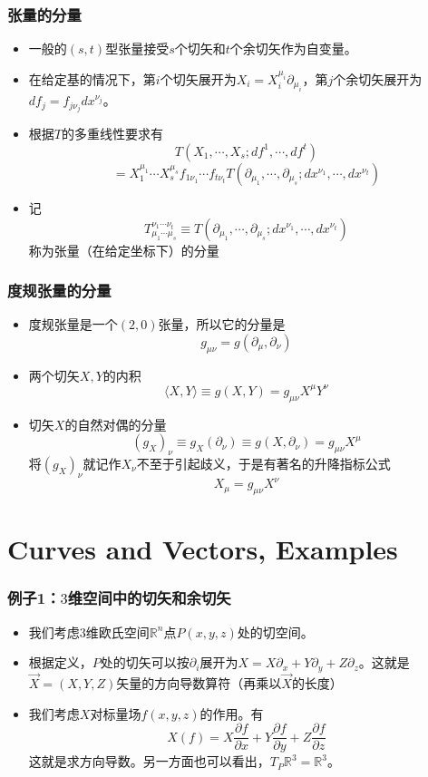 \documentclass[CJK]{beamer}
\newcommand{\reals}{\mathbb{R}}
\begin{document}
\begin{frame}
\frametitle{\bch 张量的分量 \ech}
\bch
\begin{itemize}
\item 一般的$(s,t)$型张量接受$s$个切矢和$t$个余切矢作为自变量。
\item 在给定基的情况下，第$i$个切矢展开为$X_i = X_i^{\mu_i} \partial_{\mu_i}$，第$j$个余切矢展开为$df_j = f_{j\nu_j} dx^{\nu_j}$。
\item 根据$T$的多重线性要求有$$
T(X_1,\cdots,X_s;df^1,\cdots,df^t) $$
$$
=X_1^{\mu_1} \cdots X_s^{\mu_s} f_{1\nu_1} \cdots f_{t\nu_t} T(\partial_{\mu_1} ,\cdots,\partial_{\mu_s};dx^{\nu_1},\cdots,dx^{\nu_t})
$$
\item 记{\color{blue}$$T^{\nu_1\cdots \nu_t}_{\mu_1\cdots \mu_s} \equiv  T(\partial_{\mu_1} ,\cdots,\partial_{\mu_s};dx^{\nu_1},\cdots,dx^{\nu_t})$$}
称为张量（在给定坐标下）的分量
\end{itemize}
\ech
\end{frame}

\begin{frame}
\frametitle{\bch 度规张量的分量 \ech}
\bch
\begin{itemize}
\item
度规张量是一个$(2,0)$张量，所以它的分量是
$$
g_{\mu \nu} = g(\partial_\mu,\partial_\nu)
$$
\item
两个切矢$X,Y$的内积
$$
\langle X,Y\rangle \equiv g(X,Y) = g_{\mu \nu} X^\mu Y^\nu
$$
\item 切矢$X$的自然对偶的分量
$$(g_X)_\nu \equiv g_X(\partial_\nu) \equiv g(X,\partial_\nu) = g_{\mu \nu} X^\mu 
$$
将$(g_X)_\nu$就记作$X_\nu$不至于引起歧义，于是有著名的升降指标公式
{\color{blue}
$$
X_\mu = g_{\mu \nu} X^\nu
$$}
\end{itemize}
\ech
\end{frame}

\section{Curves and Vectors, Examples}
\begin{frame}
\frametitle{\bch 例子1：$3$维空间中的切矢和余切矢 \ech}
\bch
\begin{itemize}
\item
我们考虑$3$维欧氏空间$\reals^n$点$P(x,y,z)$处的切空间。
\item
根据定义，$P$处的切矢可以按$\partial_i$展开为$X = X\partial_x + Y\partial_y + Z \partial_z$。这就是$\vec{X} = (X,Y,Z)$矢量的方向导数算符（再乘以$\vec X$的长度）
\item
我们考虑$X$对标量场$f(x,y,z)$的作用。有
$$
X(f) = X\frac{\partial f}{\partial x} + Y \frac{\partial f}{\partial y} + Z \frac{\partial f}{\partial z}
$$
这就是求方向导数。另一方面也可以看出，$T_P \reals^3 = \reals^3$。
\end{itemize}
\ech
\end{frame}
\end{document}
